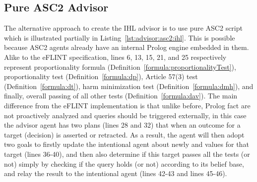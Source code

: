 \subsection{Pure ASC2 Advisor}
The alternative approach to create the IHL advisor is to use pure ASC2 script which is illustrated partially in Listing~\ref{lst:advisor:asc2:ihl}. This is possible because ASC2 agents already have an internal Prolog engine embedded in them. Alike to the eFLINT specification, lines 6, 13, 15, 21, and 25 respectively represent proportionality formula (Definition~\ref{formula:proportionalityTest}), proportionality test (Definition~\ref{formula:dp}), Article 57(3) test (Definition~\ref{formula:dt}), harm minimization test (Definition~\ref{formula:dmh}), and finally, overall passing of all other tests (Definition~\ref{formula:dav}). The main difference from the eFLINT implementation is that unlike before, Prolog fact are  not proactively analyzed and queries should be triggered externally, in this case the advisor agent has two plans (lines 28 and 32) that when an outcome for a target (decision) is asserted or retracted. As a result, the agent will then adopt two goals to firstly update the intentional agent about newly  and  values for that target (lines 36-40), and then also determine if this target passes all the tests (or not) simply by checking if the query  holds (or not) according to its belief base, and relay the result to the intentional agent (lines 42-43 and lines 45-46).



